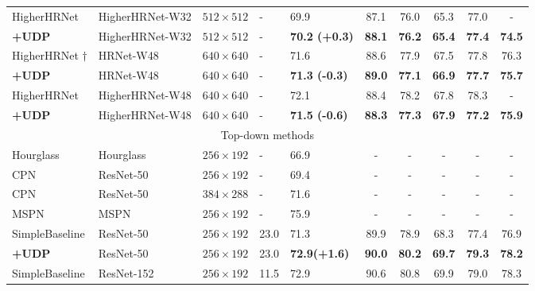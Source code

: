 \documentclass[10pt,journal,compsoc]{IEEEtran}
\begin{document}
\begin{table*}
\begin{center}
\begin{tabular}{l|l|c|l|lccccc}
HigherHRNet \cite{Higher}& HigherHRNet-W32&$512\times512$   &-&69.9                 & 87.1          & 76.0          & 65.3          &77.0           & -            \\
\textbf{+UDP}            & HigherHRNet-W32&$512\times512$   &-&\textbf{70.2 (+0.3)} & \textbf{88.1} & \textbf{76.2} & \textbf{65.4} &\textbf{77.4}  &\textbf{74.5} \\
HigherHRNet \cite{Higher}$\dagger$&HRNet-W48&$640\times640$ &-&71.6                 & 88.6              & 77.9           & 67.5          &77.8           &76.3\\
\textbf{+UDP}            &HRNet-W48       &$640\times640$   &-&\textbf{71.3 (-0.3)}        & \textbf{89.0}     & \textbf{77.1}  & \textbf{66.9} &\textbf{77.7}  &\textbf{75.7}\\
HigherHRNet \cite{Higher}& HigherHRNet-W48&$640\times640$   &-&72.1                 & 88.4          & 78.2          & 67.8          &78.3           & -            \\
\textbf{+UDP}            & HigherHRNet-W48&$640\times640$   &-&\textbf{71.5 (-0.6)} & \textbf{88.3} & \textbf{77.3} & \textbf{67.9} &\textbf{77.2}  &\textbf{75.9} \\
\hline
\multicolumn{10}{c}{Top-down methods}\\
\hline
Hourglass\cite{Hourglass}  & Hourglass        &$256\times192$    &-&66.9  & -            & -                   & -                  &-                &-   \\
CPN\cite{CPN}              & ResNet-50        &$256\times192$    &-&69.4   & -            & -                   & -                  &-                &-   \\
CPN\cite{CPN}              & ResNet-50        &$384\times288$    &-&71.6   & -                & -                  & -                   &-           &-  \\
MSPN\cite{MSPN}            & MSPN             &$256\times192$    &-&75.9     & -            & -                   & -                  &-                &-   \\
\hline
SimpleBaseline\cite{SBNet} & ResNet-50        &$256\times192$    &23.0&71.3              & 89.9     & 78.9      & 68.3     &77.4      &76.9\\
\textbf{+UDP}              & ResNet-50        &$256\times192$    &23.0&\textbf{72.9(+1.6)}  &\textbf{90.0}    &\textbf{80.2}    &\textbf{69.7}    &\textbf{79.3}   &\textbf{78.2}\\
SimpleBaseline\cite{SBNet} & ResNet-152       &$256\times192$    &11.5&72.9             & 90.6      & 80.8     & 69.9     &79.0      &78.3\\

\end{tabular}
\end{center}
\end{table*}
\end{document}
